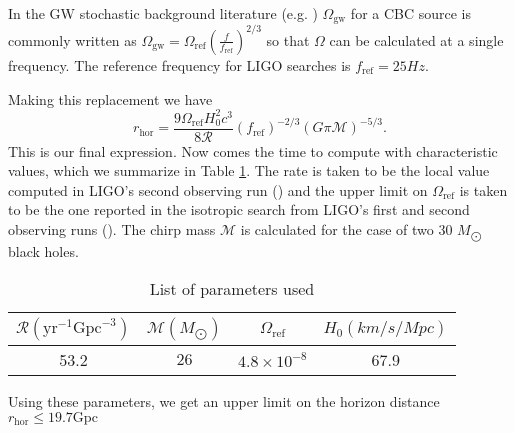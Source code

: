 \documentclass[]{article}
\newcommand{\Ogw}{\Omega_{\mathrm{gw}}}
\newcommand{\rhor}{r_{\text{hor}}}
\begin{document}
In the GW stochastic background literature (e.g. \cite{O1_stoch,O2_stoch}) $\Ogw$ for a CBC source is commonly written as $\Ogw = \Omega_{\text{ref}} (\frac{f}{f_{\text{ref}}})^{2/3}$ so that $\Omega$ can be calculated at a single frequency. 
The reference frequency for LIGO searches is $f_{\text{ref}} = 25 Hz$.  

Making this replacement we have
\begin{equation}
	\rhor=\frac{9\Omega_{\text{ref}} H_0^2 c^3}{8 \mathcal{R}} (f_{\text{ref}})^{-2/3} ( G \pi \mathcal{M})^{-5/3} .
	\label{eq:final_expression}
\end{equation}
This is our final expression.
Now comes the time to compute with characteristic values, which we summarize in Table \ref{tab:vals}. 
The rate is taken to be the local value computed in LIGO's second observing run (\cite{O2_rates}) and the upper limit on $\Omega_{\text{ref}}$ is taken to be the one reported in the isotropic search from LIGO's first and second observing runs (\cite{O2_stoch}).
The chirp mass $\mathcal{M}$ is calculated for the case of two 30 $M_{\bigodot}$ black holes.
\begin{table}
	\centering
\begin{tabular}{c|c|c|c}
	$\mathcal{R} (\mathrm{yr}^{-1} \mathrm{Gpc}^{-3})$ & $\mathcal{M} (M_{\bigodot})$  & $\Omega_{\text{ref}} $ & $H_0 (km/s/Mpc)$ \\
	\hline
	 53.2 & $26$ & $4.8\times10^{-8}$ & 67.9 \\
\end{tabular} 
\caption{List of parameters used}
\label{tab:vals}
\end{table}

Using these parameters, we get an upper limit on the horizon distance $\boxed{r_{\text{hor}} \leq 19.7 \mathrm{Gpc}}$
\end{document}
